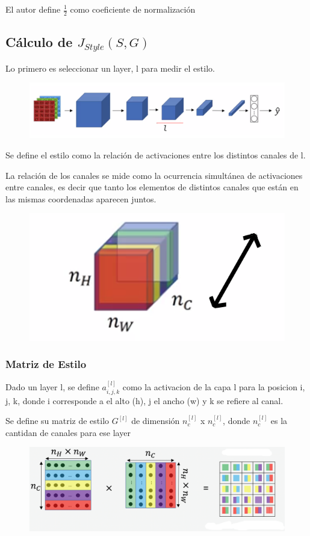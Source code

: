 \documentclass[
paper=128mm:96mm, %
fontsize=11pt, %
pagesize, %
parskip=half-, %
]{scrartcl} %
\newcommand*{\myred}[1]{\textcolor{myred}{#1}}
\theoremstyle{mythmstyle} %
\begin{document}
El autor define $\frac{1}{2}$ como coeficiente de normalizaci\'on

\clearpage



\subsection{C\'alculo de $J_{Style}(S,G)$}

Lo primero es seleccionar un layer, \myred{l} para medir el estilo.

\begin{figure}[h]
	\centering\includegraphics[width=0.6\linewidth]{imagenes/style1}
\end{figure}

Se define el estilo como la relaci\'on de activaciones entre los distintos canales de l.

La relaci\'on de los canales se mide como la ocurrencia simult\'anea de activaciones entre canales, es decir que tanto los elementos de distintos canales que est\'an en las mismas coordenadas aparecen juntos.

\begin{figure}[h]
	\centering\includegraphics[width=0.4\linewidth]{imagenes/style2}
\end{figure}

\subsubsection{Matriz de Estilo}

Dado un layer l, se define $a^{[l]}_{i,j,k}$ como la activacion de la capa l para la posicion i, j, k, donde i corresponde a el alto (h), j el ancho (w) y k se refiere al canal.

Se define su matriz de estilo $G^{[l]}$ de dimensi\'on  $n^{[l]}_{c}$ x $n^{[l]}_{c}$, donde $n^{[l]}_{c}$ es la cantidan de canales para ese layer 


\begin{figure}[h]
	\centering\includegraphics[width=0.6\linewidth]{imagenes/style3}
\end{figure}
\end{document}
